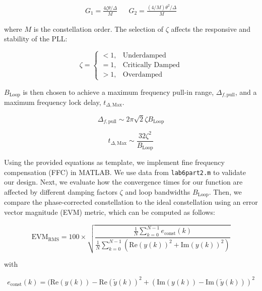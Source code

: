 \documentclass{article}
\begin{document}
\begin{align}
	G_1 = \frac{4\zeta\theta/\Delta}{M} && G_2 = \frac{(4/M)\theta^2/\Delta}{M}
\end{align}

\noindent where $M$ is the constellation order. The selection of $\zeta$ affects the responsive and stability of the PLL:

\begin{equation}
\zeta = \begin{cases}
< 1, & \text{Underdamped}\\
= 1, & \text{Critically Damped}\\
> 1, & \text{Overdamped}
\end{cases}
\end{equation}

\noindent $B_\text{Loop}$ is then chosen to achieve a maximum frequency pull-in range, $\Delta_{f,\text{pull}}$, and a maximum frequency lock delay, $t_{\Delta,\text{Max}}$.


\begin{equation}
	\Delta_{f,\text{pull}} \sim 2\pi\sqrt{2}\zeta{B_\text{Loop}}\end{equation}

\begin{equation}
	t_{\Delta,\text{Max}} \sim \frac{32\zeta^2}{B_\text{Loop}}\end{equation}
	
Using the provided equations as template, we implement fine frequency compensation (FFC) in MATLAB. We use data from \texttt{lab6part2.m} to validate our design. Next, we evaluate how the convergence times for our function are affected by different damping factors $\zeta$ and loop bandwidths $B_\text{Loop}$. Then, we compare the phase-corrected constellation to the ideal constellation using an error vector magnitude (EVM) metric, which can be computed as follows:

\begin{equation}
	\text{EVM}_\text{RMS} = 100 \times \sqrt{\frac{\frac{1}{N}\sum_{k=0}^{N-1}{e_\text{const}(k)}}{\frac{1}{N}\sum_{k=0}^{N-1}{(\text{Re}(y(k))^2 + \text{Im}(y(k))^2)}}}
\end{equation}

\noindent with

\begin{equation}
	e_\text{const}(k) = (\text{Re}(y(k)) - \text{Re}(\tilde{y}(k))^2 + (\text{Im}(y(k)) - \text{Im}(\tilde{y}(k)))^2
\end{equation}
\end{document}
